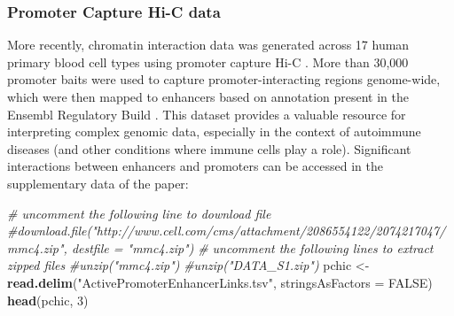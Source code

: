 \documentclass[9pt,a4paper,]{extarticle}
\newenvironment{Shaded}{\begin{snugshade}}{\end{snugshade}}
\newcommand{\KeywordTok}[1]{\textcolor[rgb]{0.13,0.29,0.53}{\textbf{#1}}}
\newcommand{\DataTypeTok}[1]{\textcolor[rgb]{0.13,0.29,0.53}{#1}}
\newcommand{\DecValTok}[1]{\textcolor[rgb]{0.00,0.00,0.81}{#1}}
\newcommand{\StringTok}[1]{\textcolor[rgb]{0.31,0.60,0.02}{#1}}
\newcommand{\CommentTok}[1]{\textcolor[rgb]{0.56,0.35,0.01}{\textit{#1}}}
\newcommand{\OtherTok}[1]{\textcolor[rgb]{0.56,0.35,0.01}{#1}}
\newcommand{\OperatorTok}[1]{\textcolor[rgb]{0.81,0.36,0.00}{\textbf{#1}}}
\newcommand{\NormalTok}[1]{#1}
\theoremstyle{definition}
\theoremstyle{definition}
\theoremstyle{definition}
\theoremstyle{remark}
\begin{document}
\begin{Shaded}
\end{Shaded}

\subsubsection{Promoter Capture Hi-C data}\label{promoter-capture-hi-c-data}

More recently, chromatin interaction data was generated across 17 human primary blood cell types using promoter capture Hi-C \citep{Javierre2016}.
More than 30,000 promoter baits were used to capture promoter-interacting regions genome-wide, which were then mapped to enhancers based on annotation present in the Ensembl Regulatory Build \citep{Zerbino2015}.
This dataset provides a valuable resource for interpreting complex genomic data, especially in the context of autoimmune diseases (and other conditions where immune cells play a role).
Significant interactions between enhancers and promoters can be accessed in the supplementary data of the paper:

\begin{Shaded}
\begin{Highlighting}[]
\CommentTok{# uncomment the following line to download file}
\CommentTok{#download.file("http://www.cell.com/cms/attachment/2086554122/2074217047/mmc4.zip", destfile = "mmc4.zip")}
\CommentTok{# uncomment the following lines to extract zipped files}
\CommentTok{#unzip("mmc4.zip")}
\CommentTok{#unzip("DATA_S1.zip")}
\NormalTok{pchic <-}\StringTok{ }\KeywordTok{read.delim}\NormalTok{(}\StringTok{"ActivePromoterEnhancerLinks.tsv"}\NormalTok{, }\DataTypeTok{stringsAsFactors =} \OtherTok{FALSE}\NormalTok{)}
\KeywordTok{head}\NormalTok{(pchic, }\DecValTok{3}\NormalTok{)}
\end{Highlighting}
\end{Shaded}
\end{document}
